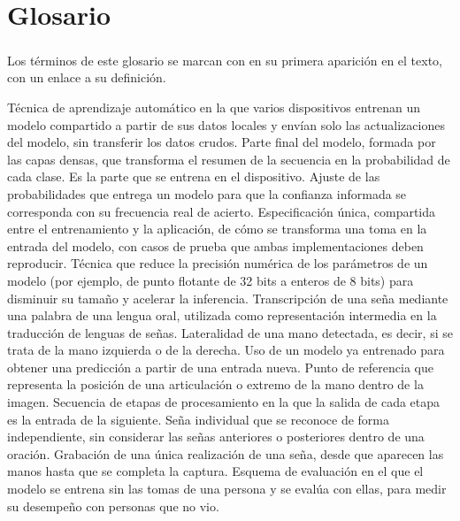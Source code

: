 \chapter*{Glosario}

Los términos de este glosario se marcan con \textsuperscript{\textdagger} en su primera aparición en el texto, con un enlace a su definición.

\begin{description}
     Técnica de aprendizaje automático en la que varios dispositivos entrenan un modelo compartido a partir de sus datos locales y envían solo las actualizaciones del modelo, sin transferir los datos crudos.
     Parte final del modelo, formada por las capas densas, que transforma el resumen de la secuencia en la probabilidad de cada clase. Es la parte que se entrena en el dispositivo.
     Ajuste de las probabilidades que entrega un modelo para que la confianza informada se corresponda con su frecuencia real de acierto.
     Especificación única, compartida entre el entrenamiento y la aplicación, de cómo se transforma una toma en la entrada del modelo, con casos de prueba que ambas implementaciones deben reproducir.
     Técnica que reduce la precisión numérica de los parámetros de un modelo (por ejemplo, de punto flotante de 32 bits a enteros de 8 bits) para disminuir su tamaño y acelerar la inferencia.
     Transcripción de una seña mediante una palabra de una lengua oral, utilizada como representación intermedia en la traducción de lenguas de señas.
     Lateralidad de una mano detectada, es decir, si se trata de la mano izquierda o de la derecha.
     Uso de un modelo ya entrenado para obtener una predicción a partir de una entrada nueva.
     Punto de referencia que representa la posición de una articulación o extremo de la mano dentro de la imagen.
     Secuencia de etapas de procesamiento en la que la salida de cada etapa es la entrada de la siguiente.
     Seña individual que se reconoce de forma independiente, sin considerar las señas anteriores o posteriores dentro de una oración.
     Grabación de una única realización de una seña, desde que aparecen las manos hasta que se completa la captura.
     Esquema de evaluación en el que el modelo se entrena sin las tomas de una persona y se evalúa con ellas, para medir su desempeño con personas que no vio.
\end{description}
